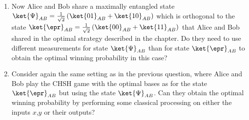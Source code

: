 \begin{exercises}
\begin{enumerate}
%
\item Now Alice and Bob share a maximally entangled state $\ket{\Psi}_{AB} =  \frac{1}{\sqrt{2}}\left(\ket{01}_{AB} + \ket{10}_{AB}\right)$ which is orthogonal to the state
$\ket{\epr}_{AB}=\frac{1}{\sqrt{2}}\left(\ket{00}_{AB}+\ket{11}_{AB}\right)$ that Alice and Bob shared in the optimal strategy described in the chapter. Do they need to use different measurements for state $\ket{\Psi}_{AB}$ than for state $\ket{\epr}_{AB}$ to obtain the optimal winning probability in this case?

\item Consider again the same setting as in the previous question, where Alice and Bob play the CHSH game with the optimal bases as for the state $\ket{\epr}_{AB}$ but using the state $\ket{\Psi}_{AB}$. Can they obtain the optimal winning probability by performing some classical processing on either the inputs $x$,$y$ or their outputs?
\end{enumerate}


\end{exercises}
